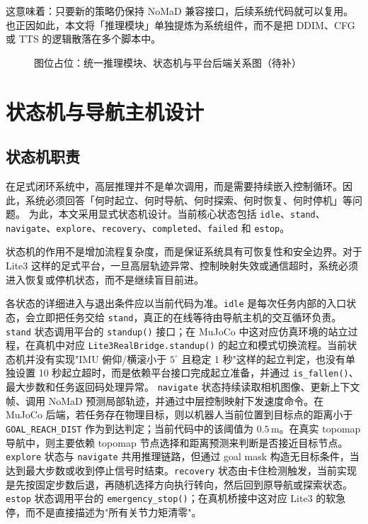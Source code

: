 这意味着：只要新的策略仍保持 NoMaD 兼容接口，后续系统代码就可以复用。也正因如此，本文将「推理模块」单独提炼为系统组件，而不是把 DDIM、CFG 或 TTS 的逻辑散落在多个脚本中。

\begin{figure}[htbp]
    \centering
    \fbox{\rule{0pt}{58mm}\rule{0.86\linewidth}{0pt}}
    \caption{图位占位：统一推理模块、状态机与平台后端关系图（待补）}
    \label{fig:framework-modules-placeholder}
\end{figure}

\section{状态机与导航主机设计}\label{sec:fsm-host}

\subsection{状态机职责}

在足式闭环系统中，高层推理并不是单次调用，而是需要持续嵌入控制循环。因此，系统必须回答「何时起立、何时导航、何时探索、何时恢复、何时停机」等问题。
为此，本文采用显式状态机设计。当前核心状态包括 \texttt{idle}、\texttt{stand}、\texttt{navigate}、\texttt{explore}、\texttt{recovery}、\texttt{completed}、\texttt{failed} 和 \texttt{estop}。

状态机的作用不是增加流程复杂度，而是保证系统具有可恢复性和安全边界。对于 Lite3 这样的足式平台，一旦高层轨迹异常、控制映射失效或通信超时，系统必须进入恢复或停机状态，而不是继续盲目前进。

各状态的详细进入与退出条件应以当前代码为准。\texttt{idle} 是每次任务内部的入口状态，会立即把任务交给 \texttt{stand}，真正的在线等待由导航主机的交互循环负责。\texttt{stand} 状态调用平台的 \texttt{standup()} 接口；在 MuJoCo 中这对应仿真环境的站立过程，在真机中对应 \texttt{Lite3RealBridge.standup()} 的起立和模式切换流程。当前状态机并没有实现"IMU 俯仰/横滚小于 $5^\circ$ 且稳定 1 秒"这样的起立判定，也没有单独设置 10 秒起立超时，而是依赖平台接口完成起立准备，并通过 \texttt{is\_fallen()}、最大步数和任务返回码处理异常。
\texttt{navigate} 状态持续读取相机图像、更新上下文帧、调用 NoMaD 预测局部轨迹，并通过中层控制映射下发速度命令。在 MuJoCo 后端，若任务存在物理目标，则以机器人当前位置到目标点的距离小于 \texttt{GOAL\_REACH\_DIST} 作为到达判定；当前代码中的该阈值为 $0.5\,\mathrm{m}$。在真实 topomap 导航中，则主要依赖 topomap 节点选择和距离预测来判断是否接近目标节点。\texttt{explore} 状态与 \texttt{navigate} 共用推理链路，但通过 goal mask 构造无目标条件，当达到最大步数或收到停止信号时结束。\texttt{recovery} 状态由卡住检测触发，当前实现是先按固定步数后退，再随机选择方向执行转向，然后回到原导航或探索状态。\texttt{estop} 状态调用平台的 \texttt{emergency\_stop()}；在真机桥接中这对应 Lite3 的软急停，而不是直接描述为"所有关节力矩清零"。

